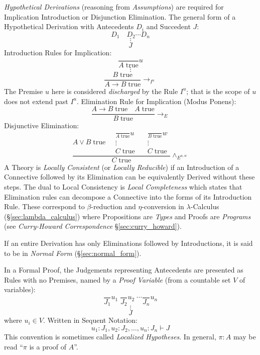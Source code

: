 \emph{Hypothetical Derivations} (reasoning from \emph{Assumptions})
are required for Implication Introduction or Disjunction
Elimination. The general form of a Hypothetical Derivation with
Antecedents $D_i$ and Succedent $J$:
\[
    D_1 \quad D_2 \cdots D_n
\]\[
    \vdots
\]\[
    J
\]
Introduction Rules for Implication:
\[
    {
        \frac{}
        {A\;\mathrm{true}}
    } u
\]\[
    \vdots
\]\[
    {
        \frac{B\;\mathrm{true}}
        {A \rightarrow B\;\mathrm{true}}
    } \rightarrow_{I^u}
\]
The Premise $u$ here is considered \emph{discharged} by the Rule
$I^u$; that is the scope of $u$ does not extend past $I^u$.
Elimination Rule for Implication (Modus Ponens):
\[
    {
        \frac{A \rightarrow B\;\mathrm{true} \quad A\;\mathrm{true}}
        {B\;\mathrm{true}}
    } \rightarrow_{E}
\]
Disjunctive Elimination:
\[
    \frac{
    A \vee B\;\mathrm{true} \quad
    \begin{matrix}
        {
            \frac{}
            {A\;\mathrm{true}}
        }u \\
        \vdots \\
        C\;\mathrm{true}
    \end{matrix}
    \quad
    \begin{matrix}
        {
            \frac{}
            {B\;\mathrm{true}}
        }w \\
        \vdots \\
        C\;\mathrm{true}
    \end{matrix}
    }{ C\;\mathrm{true}}\wedge_{E^{u,w}}
\]
A Theory is \emph{Locally Consistent} (or \emph{Locally Reducible}) if
an Introduction of a Connective followed by its Elimination can be
equivalently Derived without these steps. The dual to Local
Consistency is \emph{Local Completeness} which states that Elimination
rules can decompose a Connective into the forms of its Introduction
Rule. These correspond to $\beta$-reduction and $\eta$-conversion in
$\lambda$-Calculus (\S\ref{sec:lambda_calculus}) where Propositions
are \emph{Types} and Proofs are \emph{Programs} (see
\emph{Curry-Howard Correspondence} \S\ref{sec:curry_howard}).

If an entire Derivation has only Eliminations followed by
Introductions, it is said to be in \emph{Normal Form}
(\S\ref{sec:normal_form}).

In a Formal Proof, the Judgements representing Antecedents are
presented as Rules with no Premises, named by a \emph{Proof Variable}
(from a countable set $V$ of variables):
\[
    \frac{}{J_1}u_1 \; \frac{}{J_2}u_2 \; \cdots \frac{}{J_n}u_n
\]\[
    \vdots
\]\[
    J
\]
where $u_i \in V$. Written in Sequent Notation:
\[
    u_1:J_1, u_2:J_2, \ldots, u_n:J_n \vdash J
\]
This convention is sometimes called \emph{Localized Hypotheses}. In
general, $\pi : A$ may be read ``$\pi$ is a proof of $A$''.



